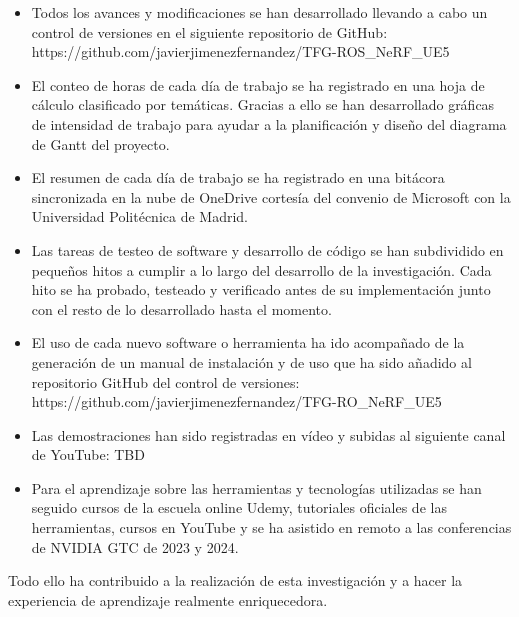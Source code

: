 \documentclass[a4paper, 12pt, spanish, twoside]{article}
\begin{document}
\begin{itemize} 
\item Todos los avances y modificaciones se han desarrollado llevando a cabo un control de versiones en el siguiente repositorio de GitHub: https://github.com/javierjimenezfernandez/TFG-ROS\_NeRF\_UE5 
\item El conteo de horas de cada día de trabajo se ha registrado en una hoja de cálculo clasificado por temáticas. Gracias a ello se han desarrollado gráficas de intensidad de trabajo para ayudar a la planificación y diseño del diagrama de Gantt del proyecto. 
\item El resumen de cada día de trabajo se ha registrado en una bitácora sincronizada en la nube de OneDrive cortesía del convenio de Microsoft con la Universidad Politécnica de Madrid. 
\item Las tareas de testeo de software y desarrollo de código se han subdividido en pequeños hitos a cumplir a lo largo del desarrollo de la investigación. Cada hito se ha probado, testeado y verificado antes de su implementación junto con el resto de lo desarrollado hasta el momento. 
\item El uso de cada nuevo software o herramienta ha ido acompañado de la generación de un manual de instalación y de uso que ha sido añadido al repositorio GitHub del control de versiones: https://github.com/javierjimenezfernandez/TFG-RO\_NeRF\_UE5 
\item Las demostraciones han sido registradas en vídeo y subidas al siguiente canal de YouTube: TBD 
\item Para el aprendizaje sobre las herramientas y tecnologías utilizadas se han seguido cursos de la escuela online Udemy, tutoriales oficiales de las herramientas, cursos en YouTube y se ha asistido en remoto a las conferencias de NVIDIA GTC de 2023 y 2024. 
\end{itemize} 


Todo ello ha contribuido a la realización de esta investigación y a hacer la experiencia de aprendizaje realmente enriquecedora. 

\clearpage




\end{document}
